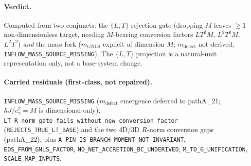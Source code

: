 \paragraph{Verdict.}
 Computed from two conjuncts: the
\(\{L,T\}\)-rejection gate (dropping \(M\) leaves \(\ge 1\) non-dimensionless
target, needing \(M\)-bearing conversion factors \(LT^{2}M\), \(L^{2}T^{2}M\),
\(L^{2}T^{2}\)) \emph{and} the mass fork (\(m_{\mathrm{GNLS}}\) explicit of
dimension \(M\); \(m_{\mathrm{defect}}\) not derived,
\texttt{INFLOW\_MASS\_SOURCE\_MISSING}). The \(\{L,T\}\) projection is a
natural-unit representation only, not a base-system change.

\paragraph{Carried residuals (first-class, not repaired).}
\texttt{INFLOW\_MASS\_SOURCE\_MISSING} (\(m_{\mathrm{defect}}\) emergence deferred
to pathA\_21; \(\hbar J/c_\gamma^{2}=M\) is dimensional-only),
\texttt{LT\_R\_norm\_gate\_fails\_without\_new\_conversion\_factor}
(\texttt{REJECTS\_TRUE\_LT\_BASE}) and the two 4D/3D \(R\)-norm conversion gaps
(pathA\_22), plus \texttt{A\_PIN\_IS\_BRANCH\_MOMENT\_NOT\_INVARIANT},
\texttt{EOS\_FROM\_GNLS\_FACTOR}, \texttt{NO\_NET\_ACCRETION\_BC\_UNDERIVED},
\texttt{M\_TO\_G\_UNIFICATION}, \texttt{SCALE\_MAP\_INPUTS}.
